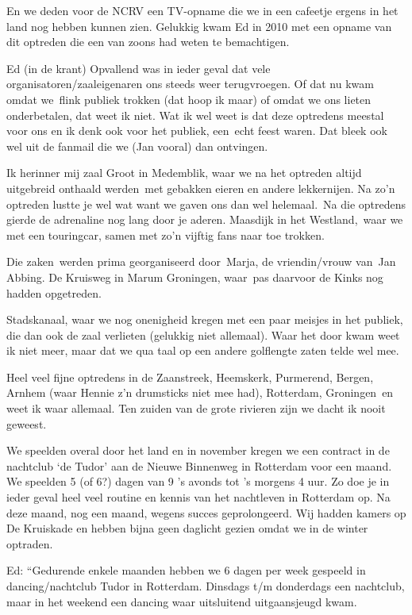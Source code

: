 \documentclass[10pt,twoside,openright]{memoir}
\begin{document}
En we deden voor de NCRV een TV-opname die we in een cafeetje ergens in het land nog hebben kunnen zien. Gelukkig kwam Ed in 2010 met een opname van dit optreden die een van zoons had weten te bemachtigen.

Ed (in de krant) Opvallend was in ieder geval dat vele organisatoren/zaaleigenaren ons steeds weer terugvroegen. Of dat nu kwam omdat we flink publiek trokken (dat hoop ik maar) of omdat we ons lieten onderbetalen, dat weet ik niet. Wat ik wel weet is dat deze optredens meestal voor ons en ik denk ook voor het publiek, een echt feest waren. Dat bleek ook wel uit de fanmail die we (Jan vooral) dan ontvingen. 

Ik herinner mij zaal Groot in Medemblik, waar we na het optreden altijd uitgebreid onthaald werden met gebakken eieren en andere lekkernijen. Na zo'n optreden lustte je wel wat want we gaven ons dan wel helemaal. Na die optredens gierde de adrenaline nog lang door je aderen. Maasdijk in het Westland, waar we met een touringcar, samen met zo'n vijftig fans naar toe trokken. 

Die zaken werden prima georganiseerd door Marja, de vriendin/vrouw van Jan Abbing. De Kruisweg in Marum Groningen, waar pas daarvoor de Kinks nog hadden opgetreden.

Stadskanaal, waar we nog onenigheid kregen met een paar meisjes in het publiek, die dan ook de zaal verlieten (gelukkig niet allemaal). Waar het door kwam weet ik niet meer, maar dat we qua taal op een andere golflengte zaten telde wel mee. 

Heel veel fijne optredens in de Zaanstreek, Heemskerk, Purmerend, Bergen, Arnhem (waar Hennie z'n drumsticks niet mee had), Rotterdam, Groningen en weet ik waar allemaal. Ten zuiden van de grote rivieren zijn we dacht ik nooit geweest. 

We speelden overal door het land en in november kregen we een contract in de nachtclub ‘de Tudor’ aan de Nieuwe Binnenweg in Rotterdam voor een maand. We speelden 5 (of 6?) dagen van 9 ’s avonds tot ’s morgens 4 uur. Zo doe je in ieder geval heel veel routine en kennis van het nachtleven in Rotterdam op. Na deze maand, nog een maand, wegens succes geprolongeerd. Wij hadden kamers op De Kruiskade en hebben bijna geen daglicht gezien omdat we in de winter optraden. 

Ed: “Gedurende enkele maanden hebben we 6 dagen per week gespeeld in dancing/nachtclub Tudor in Rotterdam. Dinsdags t/m donderdags een nachtclub, maar in het weekend een dancing waar uitsluitend uitgaansjeugd kwam. 
\end{document}
